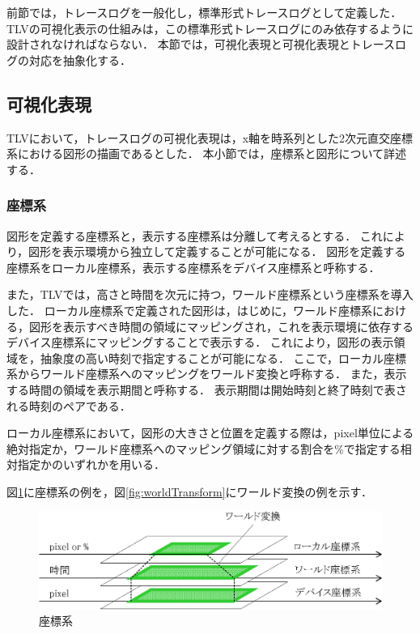 前節では，トレースログを一般化し，標準形式トレースログとして定義した．
TLVの可視化表示の仕組みは，この標準形式トレースログにのみ依存するように設計されなければならない．
本節では，可視化表現と可視化表現とトレースログの対応を抽象化する．

\subsection{可視化表現}
\label{subsec:visualization}

TLVにおいて，トレースログの可視化表現は，x軸を時系列とした2次元直交座標系における図形の描画であるとした．
本小節では，座標系と図形について詳述する．

\subsubsection{座標系}

図形を定義する座標系と，表示する座標系は分離して考えるとする．
これにより，図形を表示環境から独立して定義することが可能になる．
図形を定義する座標系をローカル座標系，表示する座標系をデバイス座標系と呼称する．

また，TLVでは，高さと時間を次元に持つ，ワールド座標系という座標系を導入した．
ローカル座標系で定義された図形は，はじめに，ワールド座標系における，図形を表示すべき時間の領域にマッピングされ，これを表示環境に依存するデバイス座標系にマッピングすることで表示する．
これにより，図形の表示領域を，抽象度の高い時刻で指定することが可能になる．
ここで，ローカル座標系からワールド座標系へのマッピングをワールド変換と呼称する．
また，表示する時間の領域を表示期間と呼称する．
表示期間は開始時刻と終了時刻で表される時刻のペアである．

ローカル座標系において，図形の大きさと位置を定義する際は，pixel単位による絶対指定か，ワールド座標系へのマッピング領域に対する割合を\%で指定する相対指定かのいずれかを用いる．

図\ref{fig:coordinate}に座標系の例を，図\ref{fig:worldTransform}にワールド変換の例を示す．

\begin{figure}[tb]
\begin{center}
\includegraphics[scale=0.75]{img/coordinate.eps}
\caption{座標系}
\label{fig:coordinate}
\end{center}
\end{figure}

